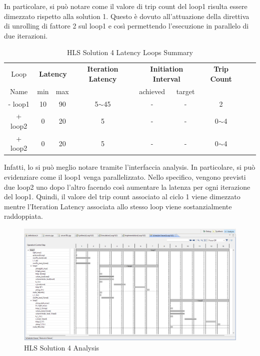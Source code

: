 In particolare, si può notare come il valore di trip count del loop1 risulta essere dimezzato rispetto alla solution 1. Questo è dovuto all'attuazione della direttiva  di unrolling di fattore 2 sul loop1 e così permettendo l'esecuzione in parallelo di due iterazioni.

\begin{table}[H]
	\centering
	\begin{tabular}{|c|c|c|c|c|c|c|c|c|}
		\hline
		\multicolumn{1}{|c|}{Loop} & \multicolumn{2}{|c|}{\textbf{Latency}} & \multicolumn{1}{c|}{\textbf{Iteration Latency}} & \multicolumn{2}{c|}{\textbf{Initiation Interval}} & \multicolumn{1}{c|}{\textbf{Trip Count}}  \\
		Name & min & max &  & achieved & target &  \\
		\hline
		- loop1 & 10 & 90 & 5$\sim$45 & - & - & 2 \\
		+ loop2 & 0 & 20 & 5 & - & - & 0$\sim$4 \\
		+ loop2 & 0 & 20 & 5 & - & - & 0$\sim$4 \\
		\hline
	\end{tabular}
	\caption{HLS Solution 4 Latency Loops Summary}
	\label{tab:hls-solution-4-loop-summary}
\end{table}

Infatti, lo si può meglio notare tramite l'interfaccia analysis. In particolare, si può evidenziare come il loop1 venga parallelizzato. Nello specifico, vengono previsti due loop2 uno dopo l'altro facendo così aumentare la latenza per ogni iterazione del loop1. Quindi, il valore del trip count associato al ciclo 1 viene dimezzato mentre l'Iteration Latency associata allo stesso loop viene sostanzialmente raddoppiata. 

\begin{figure}[H]
	\centering
	\includegraphics[width=1\textwidth]{solutions/s4/s4analysis.png}
	\caption{HLS Solution 4 Analysis}
\end{figure}

